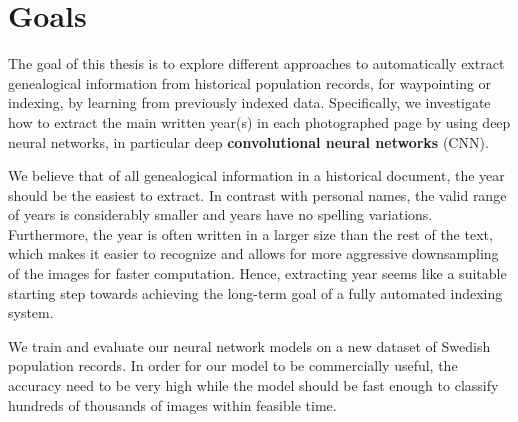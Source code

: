 \section{Goals}

The goal of this thesis is to explore different approaches to automatically extract genealogical information from historical population records, for waypointing or indexing, by learning from previously indexed data. Specifically, we investigate how to extract the main written year(s) in each photographed page by using deep neural networks, in particular deep \textbf{convolutional neural networks} (CNN).

We believe that of all genealogical information in a historical document, the year should be the easiest to extract.
In contrast with personal names, the valid range of years is considerably smaller and years have no spelling variations. Furthermore, the year is often written in a larger size than the rest of the text, which makes it easier to recognize and allows for more aggressive downsampling of the images for faster computation.
Hence, extracting year seems like a suitable starting step towards achieving the long-term goal of a fully automated indexing system.



We train and evaluate our neural network models on a new dataset of Swedish population records.
In order for our model to be commercially useful, the accuracy need to be very high while the model should be fast enough to classify hundreds of thousands of images within feasible time.



